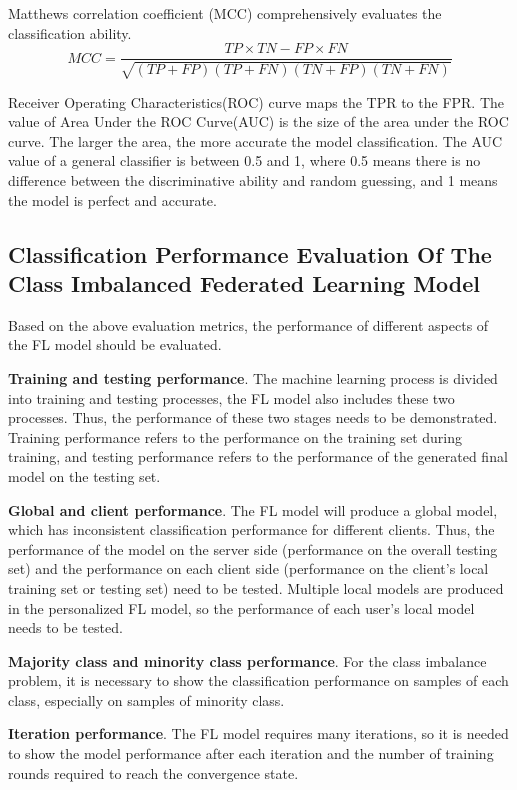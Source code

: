 \documentclass[10pt,journal,compsoc]{IEEEtran}
\begin{document}
	Matthews correlation coefficient (MCC) comprehensively evaluates the classification ability.
	\begin{equation}
	MCC=\frac{TP \times TN-FP \times FN}{\sqrt{(TP+FP)(TP+FN)(TN+FP)(TN+FN)}}
	\end{equation}
	
	Receiver Operating Characteristics(ROC) curve maps the TPR to the FPR. The value of Area Under the ROC Curve(AUC) is the size of the area under the ROC curve. The larger the area, the more accurate the model classification. The AUC value of a general classifier is between 0.5 and 1, where 0.5 means there is no difference between the discriminative ability and random guessing, and 1 means the model is perfect and accurate. 
	
	\subsection{Classification Performance Evaluation Of The Class Imbalanced Federated Learning Model}
	Based on the above evaluation metrics, the performance of different aspects of the FL model should be evaluated.
	
	\textbf{Training and testing performance}. The machine learning process is divided into training and testing processes, the FL model also includes these two processes. Thus, the performance of these two stages needs to be demonstrated. Training performance refers to the performance on the training set during training, and testing performance refers to the performance of the generated final model on the testing set.
	
	\textbf{Global and client performance}. The FL model will produce a global model, which has inconsistent classification performance for different clients. Thus, the performance of the model on the server side (performance on the overall testing set) and the performance on each client side (performance on the client's local training set or testing set) need to be tested. Multiple local models are produced in the personalized FL model, so the performance of each user's local model needs to be tested.
	
	\textbf{Majority class and minority class performance}. For the class imbalance problem, it is necessary to show the classification performance on samples of each class, especially on samples of minority class.
	
	\textbf{Iteration performance}. The FL model requires many iterations, so it is needed to show the model performance after each iteration and the number of training rounds required to reach the convergence state.
	
\end{document}
